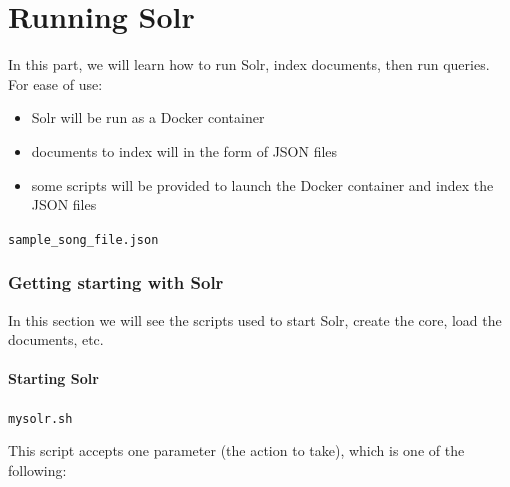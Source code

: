 
\renewcommand{\currentPart}{Running Solr}
\part{\currentPart}  \label{part - Running Solr}

In this part, we will learn how to run Solr, index documents, then run queries. \\

For ease of use:
\begin{itemize}
	\item Solr will be run as a Docker container
	\item documents to index will in the form of JSON files
	\item some scripts will be provided to launch the Docker container and index the JSON files
\end{itemize}

\texttt{sample\_song\_file.json}

\bigskip







\section{Getting starting with Solr}

In this section we will see the scripts used to start Solr, create the core, load the documents, etc. 

\subsection{Starting Solr} \label{starting-solr}

\texttt{mysolr.sh} \label{mysolr.sh}

\bigskip


This script accepts one parameter (the action to take), which is one of the following: 

